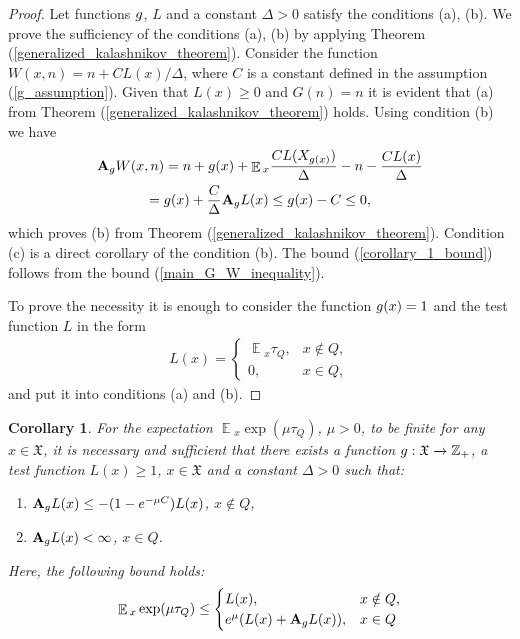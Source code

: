\documentclass[10pt, reqno]{amsart}
\newtheorem{repeated_corollary}{Corollary}
\theoremstyle{definition}
\newcommand{\aasVar}{Q} %
\newcommand{\astVar}{\tau} %
\newcommand{\gtfVar}{G} %
\newcommand{\wtfVar}{W} %
\newcommand{\atoVar}{\mathbf{A}} %
\newcommand{\ltfVar}{L} %
\newcommand{\assVar}{\mathfrak{X}} %
\newcommand{\integers}{\mathbb{Z}} %
\DeclareMathOperator*{\E}{\mathbb{E}}
\begin{document}
	\begin{proof}
		Let functions $g$, $\ltfVar$ and a constant $\Delta > 0$ satisfy the conditions (a), (b). We prove the sufficiency of the conditions (a), (b) by applying Theorem (\ref{generalized_kalashnikov_theorem}). Consider the function $\wtfVar(x, n) = n + C\ltfVar(x) / \Delta$, where $C$ is a constant defined in the assumption (\ref{g_assumption}). Given that $\ltfVar(x) \geq 0$ and $\gtfVar(n) = n$ it is evident that (a) from Theorem (\ref{generalized_kalashnikov_theorem}) holds. Using condition (b) we have
		\begin{gather*}
		\atoVar_{\gffVar}\wtfVar(x, n) = n + \gffVar(x) + \E{}_{x}\frac{C\ltfVar(X_{g(x)})}{\Delta} - n - \frac{C\ltfVar(x)}{\Delta} \\ = \gffVar(x) + \frac{C}{\Delta}\atoVar_{\gffVar}\ltfVar(x) \leq \gffVar(x) - C \leq 0,
		\end{gather*}
		which proves (b) from Theorem (\ref{generalized_kalashnikov_theorem}). Condition (c) is a direct corollary of the condition (b). The bound (\ref{corollary_1_bound}) follows from the bound (\ref{main_G_W_inequality}).
		
		To prove the necessity it is enough to consider the function $g(x) = 1$ and the test function $\ltfVar$ in the form
		\begin{gather*}
		\ltfVar(x) = \begin{cases}
		\E{}_{x}\astVar_{\aasVar}, & x \notin \aasVar,\\
		0, & x \in \aasVar,
		\end{cases}
		\end{gather*}
		and put it into conditions (a) and (b).
	\end{proof}
	
	\begin{repeated_corollary}
		For the expectation $\E{}_{x}\exp(\mu\astVar_{\aasVar})$, $\mu > 0$, to be finite for any $x \in \assVar$, it is necessary and sufficient that there exists a function $\gffVar:\assVar \xrightarrow{} \integers_{+}$, a test function $\ltfVar(x) \geq 1$, $x \in \assVar$ and a constant $\Delta > 0$ such that:
		\begin{enumerate}
			\item[(a)] $\atoVar_{\gffVar}\ltfVar(x) \leq -(1 - e^{-\mu C})\ltfVar(x)$, $x \notin \aasVar$,
			\item[(b)] $\atoVar_{\gffVar}\ltfVar(x) < \infty$, $x \in \aasVar$.
		\end{enumerate}
		Here, the following bound holds:
		\begin{align}
		\E{}_{x}\exp(\mu\astVar_{\aasVar}) \leq \begin{cases}
		\ltfVar(x), & x \notin \aasVar, \\
		e^{\mu}(\ltfVar(x) + \atoVar_{\gffVar}\ltfVar(x)), & x \in \aasVar
		\end{cases}
		\label{corollary_2_bound}
		\end{align}
	\end{repeated_corollary}
	
\end{document}
